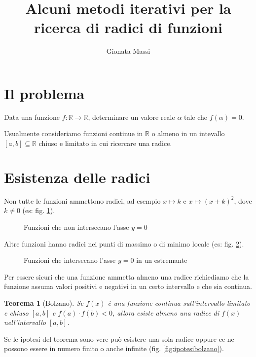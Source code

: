 \documentclass[10pt]{article}
\title{Alcuni metodi iterativi per la ricerca di radici di funzioni}
\author{Gionata Massi}
\date{} %
\newtheorem{theorem}{Teorema}
\begin{document}
\maketitle

\thispagestyle{empty}%

\section{Il problema}

Data una funzione $f : \mathbb{R} \to \mathbb{R}$, determinare un valore reale $\alpha$ tale che $f(\alpha) = 0$.

Usualmente consideriamo funzioni continue in $\mathbb{R}$ o almeno in un intevallo $[a, b] \subseteq \mathbb{R}$ chiuso e limitato in cui ricercare una radice.

\section{Esistenza delle radici}

Non tutte le funzioni ammettono radici, ad esempio $x \mapsto k$ e $x \mapsto (x + k)^2$, dove $k \neq 0$ (es: fig. \ref{fig:no_zeri}).

\begin{figure}[ht]
    \centering
    
    \caption{Funzioni che non intersecano l'asse $y = 0$}
    \label{fig:no_zeri}
\end{figure}
    
Altre funzioni hanno radici nei punti di massimo o di minimo locale (es: fig. \ref{fig:zero_estremante}).

\begin{figure}[ht]
    \centering
    
    \caption{Funzioni che intersecano l'asse $y = 0$ in un estremante}
    \label{fig:zero_estremante}
\end{figure}
    

Per essere sicuri che una funzione ammetta almeno una radice richiediamo che la funzione assuma valori positivi e negativi in un certo intervallo e che sia continua.

\begin{theorem}[Bolzano]
Se $f (x)$ è una funzione continua sull'intervallo limitato e chiuso $[a, b]$ e $f (a) \cdot f (b) < 0$, allora esiste almeno una radice di $f (x)$ nell'intervallo $[a, b]$.
\end{theorem}

Se le ipotesi del teorema sono vere può esistere una sola radice oppure ce ne possono essere in numero finito o anche infinite (fig. \ref{fig:ipotesibolzano}).
\end{document}
